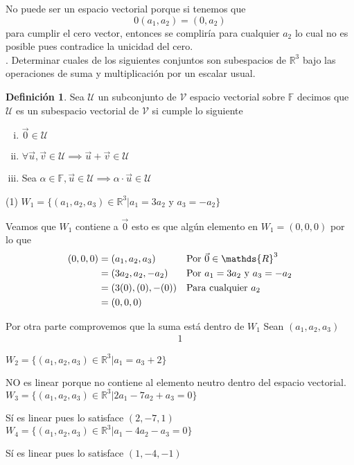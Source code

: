 \documentclass[letterpaper]{article}
\newcommand{\F}{\mathds{F}}
\newcommand{\R}{\mathds{R}}
\renewcommand{\*}{\cdot}
\theoremstyle{definition}
\newtheorem{definition}{Definición}[section]
\begin{document}
No puede ser un espacio vectorial porque si tenemos que \[ 0(a_1, a_2) = (0, a_2)  \] para cumplir el cero vector, entonces se compliría para cualquier $a_2$ lo cual no es posible pues contradice la unicidad del cero.\\

. Determinar cuales de los siguientes conjuntos son subespacios de $\mathbb{R}^{3}$ bajo las operaciones de suma y multiplicación por un escalar usual.\\
\begin{definition}
	Sea $ \mathcal{U} $ un subconjunto de $ \mathcal{V}$ espacio vectorial sobre $ \F $ decimos que $ \mathcal{U} $ es un subespacio vectorial de $ \mathcal{V} $ si cumple lo siguiente
	\begin{enumerate}[i)]
		\item $ \vec{0}  \in \mathcal{U} $
		\item $ \forall \vec{u}, \vec{v} \in \mathcal{U} \implies \vec{u} + \vec{v} \in \mathcal{U} $
		\item Sea $ \alpha \in \F, \vec{u} \in \mathcal{U} \implies \alpha \* \vec{u} \in \mathcal{U} $
	\end{enumerate}
	   
\end{definition}
\begin{tasks}(1)
\task $W_{1} = \lbrace (a_{1},a_{2},a_{3}) \in \mathbb{R}^{3} \big\vert  a_{1}=3a_{2}$ y $a_{3}=-a_{2} \rbrace$

Veamos que $ W_{1} $ contiene a $ \vec{0} $ esto es que algún elemento en $ W_{1} = (0,0,0) $ por lo que 
	\begin{align*}
		(0,0,0) &= (a_{1},a_{2},a_{3}) && \text{Por $ \vec{0} \in \R^3 $}\\
		&= (3a_{2},a_{2},-a_{2}) && \text{Por $a_{1}=3a_{2}$ y $a_{3}=-a_{2}$}\\
		&= (3(0),(0),-(0)) && \text{Para cualquier $ a_2 $}\\
		&= (0,0,0)
	\end{align*}
	
Por otra parte comprovemos que la suma está dentro de $ W_1 $ 
Sean $(a_{1},a_{2},a_{3})  $
\begin{align*}
	1
\end{align*}

\task $W_{2} = \lbrace (a_{1},a_{2},a_{3}) \in \mathbb{R}^{3} \big\vert  a_{1} = a_{3} + 2 \rbrace$

NO es linear porque no contiene al elemento neutro dentro del espacio vectorial.
\task $W_{3} = \lbrace (a_{1},a_{2},a_{3}) \in \mathbb{R}^{3} \big\vert  2a_{1} - 7a_{2} + a_{3} = 0 \rbrace$

Sí es linear pues lo satisface $(2,-7,1)$
\task $W_{4} = \lbrace (a_{1},a_{2},a_{3}) \in \mathbb{R}^{3} \big\vert  a_{1} - 4a_{2} - a_{3} = 0 \rbrace$

Sí es linear pues lo satisface $(1,-4,-1)$

\end{tasks}
\end{document}

